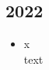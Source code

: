 \subsection*{2022}
\begin{history}


    \begin{itemize}

        \item x\\
              text

    \end{itemize}

\end{history}
